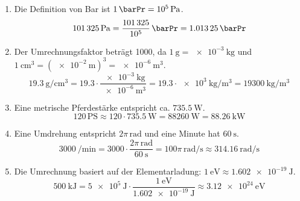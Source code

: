 \documentclass[ngerman]{scrreprt}
\newenvironment{loesungbox}[1]
  {\needspace{5\baselineskip}\begin{loesungboxstyle}[frametitle={#1}]}
  {\end{loesungboxstyle}}
\begin{document}
\begin{loesungbox}{Lösung zu \Cref{aufg:umrechnung_einheiten}}
\begin{enumerate}
    \item Die Definition von Bar ist $\SI{1}{\barPr} = \SI{e5}{\pascal}$.
    \begin{equation}
        \SI{101325}{\pascal} = \frac{\num{101325}}{\num{e5}}\,\si{\barPr} = \SI{1.01325}{\barPr}
    \end{equation}

    \item Der Umrechnungsfaktor beträgt 1000, da $\SI{1}{\gram} = \SI{e-3}{\kilo\gram}$ und \\$\SI{1}{\centi\meter\cubed} = (\SI{e-2}{\meter})^3 = \SI{e-6}{\meter\cubed}$.
    \begin{equation}
        \SI{19.3}{\gram\per\centi\meter\cubed} = 19.3 \cdot \frac{\SI{e-3}{\kilo\gram}}{\SI{e-6}{\meter\cubed}} = 19.3 \cdot \SI{e3}{\kilo\gram\per\meter\cubed} = \SI{19300}{\kilo\gram\per\meter\cubed}
    \end{equation}

    \item Eine metrische Pferdestärke entspricht ca. $\SI{735.5}{\watt}$.
    \begin{equation}
        120\,\text{PS} \approx 120 \cdot \SI{735.5}{\watt} = \SI{88260}{\watt} = \SI{88.26}{\kilo\watt}
    \end{equation}
    
    \item Eine Umdrehung entspricht $2\pi\,\si{\radian}$ und eine Minute hat $\SI{60}{\second}$.
    \begin{equation}
        \SI{3000}{\per\minute} = 3000 \cdot \frac{2\pi\,\si{\radian}}{\SI{60}{\second}} = 100\pi\,\si{\radian\per\second} \approx \SI{314.16}{\radian\per\second}
    \end{equation}

    \item Die Umrechnung basiert auf der Elementarladung: $\SI{1}{\electronvolt} \approx \SI{1.602e-19}{\joule}$.
    \begin{equation}
        \SI{500}{\kilo\joule} = \SI{5e5}{\joule} \cdot \frac{\SI{1}{\electronvolt}}{\SI{1.602e-19}{\joule}} \approx \SI{3.12e24}{\electronvolt}
    \end{equation}
\end{enumerate}
\end{loesungbox}
\end{document}
